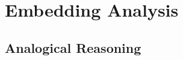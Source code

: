 



\section{Embedding Analysis} \label{sec:analysis}


\subsection{Analogical Reasoning} \label{sec:analysis_analogy}








